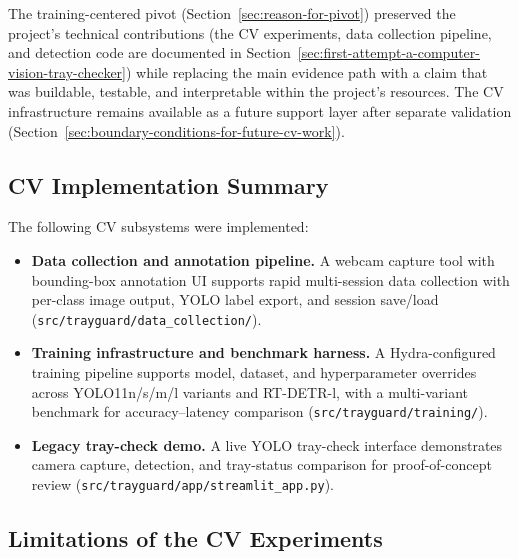 \documentclass[10pt,a4paper]{article}
\begin{document}
The training-centered pivot (Section~\ref{sec:reason-for-pivot}) preserved the project's technical contributions
(the CV experiments, data collection pipeline, and detection code are
documented in Section~\ref{sec:first-attempt-a-computer-vision-tray-checker})
while replacing the main evidence path with a claim that was buildable,
testable, and interpretable within the project's resources. The CV infrastructure
remains available as a future support layer after separate validation
(Section~\ref{sec:boundary-conditions-for-future-cv-work}).

\subsection{CV Implementation Summary}

The following CV subsystems were implemented:

\begin{itemize}
   \item \textbf{Data collection and annotation pipeline.} A webcam capture tool with bounding-box annotation UI supports rapid multi-session data collection with per-class image output, YOLO label export, and session save/load (\texttt{src/trayguard/data\_collection/}).
   \item \textbf{Training infrastructure and benchmark harness.} A Hydra-configured training pipeline supports model, dataset, and hyperparameter overrides across YOLO11n/s/m/l variants and RT-DETR-l, with a multi-variant benchmark for accuracy--latency comparison (\texttt{src/trayguard/training/}).
   \item \textbf{Legacy tray-check demo.} A live YOLO tray-check interface demonstrates camera capture, detection, and tray-status comparison for proof-of-concept review (\texttt{src/trayguard/app/streamlit\_app.py}).
\end{itemize}

\subsection{Limitations of the CV Experiments}
\end{document}
